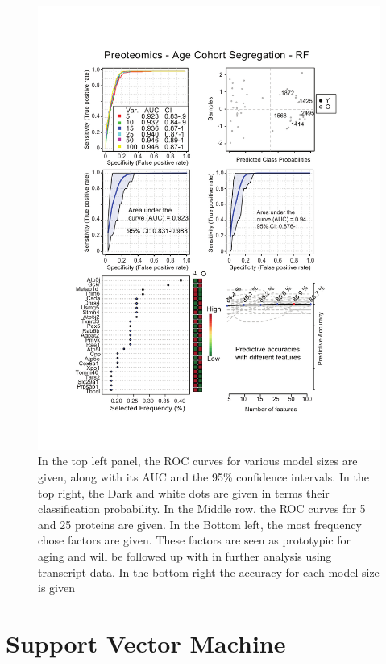 \documentclass[a4paper,11pt,twoside]{book}
\begin{document}
	\begin{figure}[htb!]
		\centering
		\includegraphics[width=1.1\linewidth]{3.Proteomics/Proteomics_Vingette_Random_Forest_Age}
        \caption[Random Forest Classifier for Young and Old Mice]{In the top left panel, the ROC curves for various model sizes are given, along with its AUC and the 95\% confidence intervals. In the top right, the Dark and white dots are given in terms their classification probability. In the Middle row, the ROC curves for 5 and 25 proteins are given. In the Bottom left, the most frequency chose factors are given. These factors are seen as prototypic for aging and will be followed up with in further analysis using transcript data. In the bottom right the accuracy for each model size is given} 
        \label{fig:proteomicsvingetterandomforestage} 
	\end{figure}
	
	\clearpage
	\section{Support Vector Machine}
	
\end{document}
